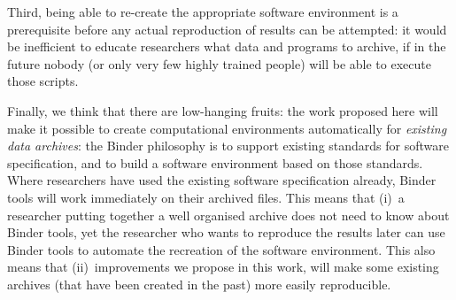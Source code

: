 Third, being able to re-create the appropriate software environment is a
prerequisite before any actual reproduction of results can be attempted: it
would be inefficient to educate researchers what data and programs to archive,
if in the future nobody (or only very few highly trained people) will be able to
execute those scripts.

Finally, we think that there are low-hanging fruits: the work proposed here will
make it possible to create computational environments automatically for
\emph{existing data archives}: the Binder philosophy is to support existing standards for software
specification, and to build a software environment based on those standards.
Where researchers have used the existing software specification already, Binder tools
will work immediately on their archived files. This means that (i)~a researcher
putting together a well organised archive does not need to know about Binder tools,
yet the researcher who wants to reproduce the results later can use Binder tools to
automate the recreation of the software environment. This also means that
(ii)~improvements we propose in this work, will make some existing archives (that
have been created in the past) more easily reproducible.


